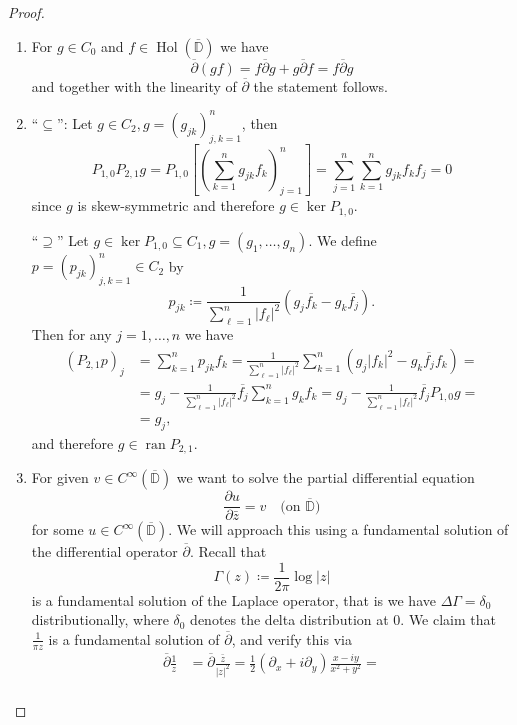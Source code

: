\documentclass[letterpaper, 11pt]{article}
\newcommand{\D}{\mathbb{D}}
\newcommand{\1}{\mathds{1}}
\newcommand{\cl}[1]{\overline{#1}}
\newcommand{\wirtzbar}{\overline{\partial}}
\DeclareMathOperator*{\ran}{ran}
\DeclareMathOperator*{\Hol}{Hol}
\theoremstyle{definition}
\begin{document}
\begin{proof}{\ }
  \begin{enumerate}
    \item For $g \in C_0$ and $f \in \Hol(\cl{\D})$ we have
    $$ \wirtzbar (gf) = f \wirtzbar g + g \wirtzbar f = f \wirtzbar g $$
    and together with the linearity of $\wirtzbar$ the statement follows.
    \item ``$\subseteq$'': Let $g \in C_2, g = (g_{jk})_{j,k=1}^n$, then
    $$ P_{1,0} P_{2,1} g = P_{1,0} \left[ \left( \sum_{k=1}^n g_{jk} f_k \right)_{j=1}^n \right] = \sum_{j=1}^n \sum_{k=1}^n g_{jk} f_k f_j = 0 $$
    since $g$ is skew-symmetric and therefore $g \in \ker P_{1,0}$.

    ``$\supseteq$'' Let $g \in \ker P_{1,0} \subseteq C_1, g = (g_1, \dots, g_n)$. We define $p = (p_{jk})_{j,k=1}^n \in C_2$ by
    $$ p_{jk} \coloneqq \frac{1}{\displaystyle\sum_{\ell=1}^n \vert f_\ell \vert^2} (g_j \overline{f_k} - g_k \overline{f_j}). $$
    Then for any $j=1,\dots,n$ we have
    \begin{align*}
      (P_{2,1} p)_j &= \sum_{k=1}^n p_{jk} f_k = \frac{1}{\displaystyle\sum_{\ell=1}^n \vert f_\ell \vert^2} \sum_{k=1}^n (g_j \vert f_k \vert^2 - g_k \overline{f_j} f_k) = \\
      &= g_j - \frac{1}{\displaystyle\sum_{\ell=1}^n \vert f_\ell \vert^2} \overline{f_j} \sum_{k=1}^n g_k f_k = g_j - \frac{1}{\displaystyle\sum_{\ell=1}^n \vert f_\ell \vert^2} \overline{f_j} P_{1,0} g = \\
      &= g_j,
    \end{align*}
    and therefore $g \in \ran P_{2,1}$.
    \item For given $v \in C^\infty(\cl{\D})$ we want to solve the partial differential equation
    $$ \frac{\partial u}{\partial \bar{z}} = v \quad \textrm{(on $\cl\D$)} $$
    for some $u \in C^\infty(\cl{\D})$. We will approach this using a fundamental solution of the differential operator $\wirtzbar$. Recall that
    $$ \Gamma(z) \coloneqq \frac{1}{2 \pi} \log \vert z \vert $$
    is a fundamental solution of the Laplace operator, that is we have $\Delta \Gamma = \delta_0$ distributionally, where $\delta_0$ denotes the delta distribution at 0. We claim that $\frac{1}{\pi z}$ is a fundamental solution of $\wirtzbar$, and verify this via
    \begin{align*}
      \wirtzbar \frac{1}{z} &= \wirtzbar \frac{\bar{z}}{\vert z \vert^2} = \frac{1}{2} (\partial_x + i \partial_y) \frac{x - i y}{x^2 + y^2} = \\

\end{align*}
\end{enumerate}
\end{proof}
\end{document}
